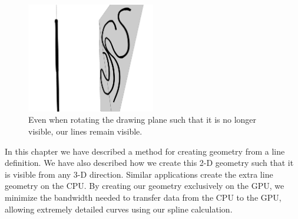 \documentclass[11pt]{report}
\begin{document}
\begin{figure}
\begin{center}
\includegraphics[width=0.5\textwidth]{rotation.png}
\caption{Even when rotating the drawing plane such that it is no longer visible, our lines remain visible.}
\end{center}
\end{figure}

In this chapter we have described a method for creating geometry from a line definition.
We have also described how we create this 2-D geometry such that it is visible from any 3-D direction.
Similar applications create the extra line geometry on the CPU.
By creating our geometry exclusively on the GPU, we minimize the bandwidth needed to transfer data from the CPU to the GPU, allowing extremely detailed curves using our spline calculation.
\end{document}
